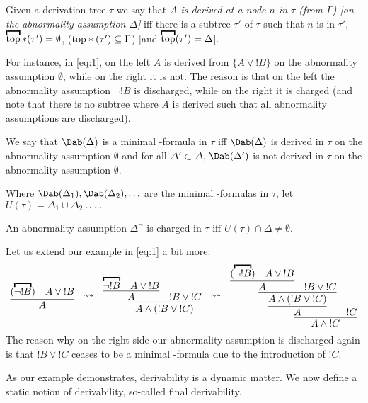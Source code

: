 \begin{defn}
  Given a derivation tree $\tau$ we say that \emph{$A$ is
    derived at a node $n$ in $\tau$ (from $\Gamma$) [on the
    abnormality assumption $\Delta$]} iff there is a subtree
  $\tau'$ of $\tau$ such that $n$ is in $\tau'$,
  $\overbracket{\rm top}*(\tau') = \emptyset$, (${\rm
    top}*(\tau') \subseteq \Gamma$) [and $\overbracket{\rm
    top}(\tau') = \Delta$].
\end{defn}
For instance, in \eqref{eq:1}, on the left $A$ is derived
from $\{A \vee {!}B\}$ on the abnormality assumption
$\emptyset$, while on the right it is not. The reason is that
on the left the abnormality assumption $\neg !B$ is
discharged, while on the right it is charged (and note that
there is no subtree where $A$ is derived such that all
abnormality assumptions are discharged).

We say that $\Dab(\Delta)$ is a minimal \Dab-formula in
$\tau$ iff $\Dab(\Delta)$ is derived in $\tau$ on the
abnormality assumption $\emptyset$ and for all $\Delta'
\subset \Delta$, $\Dab(\Delta')$ is not derived in $\tau$ on
the abnormality assumption $\emptyset$.

Where $\Dab(\Delta_1), \Dab(\Delta_2), \ldots$ are the
minimal \Dab-formulas in $\tau$, let $U(\tau) = \Delta_1 \cup
\Delta_2 \cup \ldots$
 
\begin{defn}
  An abnormality assumption $\Delta^\neg$ is charged in
  $\tau$ iff $U(\tau) \cap \Delta \neq \emptyset$.
\end{defn}

Let us extend our example in \eqref{eq:1} a bit more:
\begin{equation}\label{eq:2}
  \vcenter{\infer{A}{(\overbracket{\neg !B}) & A \vee {!}B}}
  ~~\leadsto~~  %
  \vcenter{\infer{A \wedge (!B \vee
      {!}C)}{\infer{A}{\overbracket{\neg !B} 
        & A \vee {!}B} & !B \vee {!}C}} %
  ~~\leadsto~~ %
  \vcenter{\infer{A \wedge {!}C}{\infer{A}{\infer{A \wedge (!B \vee
      {!}C)}{\infer{A}{(\overbracket{\neg !B}) 
        & A \vee {!}B} & !B \vee {!}C}}& !C}} %
\end{equation}
The reason why on the right side our abnormality assumption
is discharged again is that $!B \vee {!}C$ ceases to be a
minimal \Dab-formula due to the introduction of $!C$.

As our example demonstrates, derivability is a dynamic
matter. We now define a static notion of derivability,
so-called final derivability.

